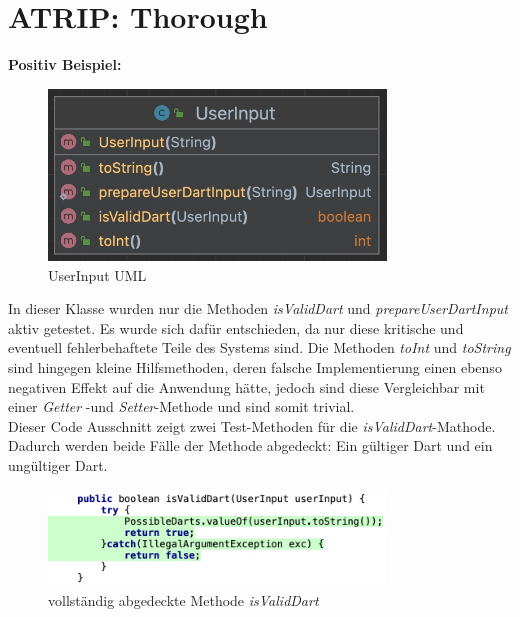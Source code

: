 \section{ATRIP: Thorough}
\textbf{Positiv Beispiel:}\\
\begin{figure}[ht]
    \centering
    \includegraphics[width=0.8\textwidth]{Bilder/UserInputUML.png}
    \caption{UserInput UML}
    \label{fig:userinput-uml}
\end{figure}
In dieser Klasse wurden nur die Methoden \textit{isValidDart} und \textit{prepareUserDartInput} aktiv getestet. Es wurde sich dafür entschieden, da nur diese kritische und eventuell fehlerbehaftete Teile des Systems sind. Die Methoden \textit{toInt} und \textit{toString} sind hingegen kleine Hilfsmethoden, deren falsche Implementierung einen ebenso negativen Effekt auf die Anwendung hätte, jedoch sind diese Vergleichbar mit einer \textit{Getter} -und \textit{Setter}-Methode und sind somit trivial.\\

Dieser Code Ausschnitt zeigt zwei Test-Methoden für die \textit{isValidDart}-Mathode. Dadurch werden beide Fälle der Methode abgedeckt: Ein gültiger Dart und ein ungültiger Dart.\\
\begin{figure}[ht]
    \centering
    \includegraphics[width=0.8\textwidth]{Bilder/thoroughexample.png}
    \caption{vollständig abgedeckte Methode \textit{isValidDart}}
    \label{fig:isValidDart-Coverage-Code}
\end{figure}\\
